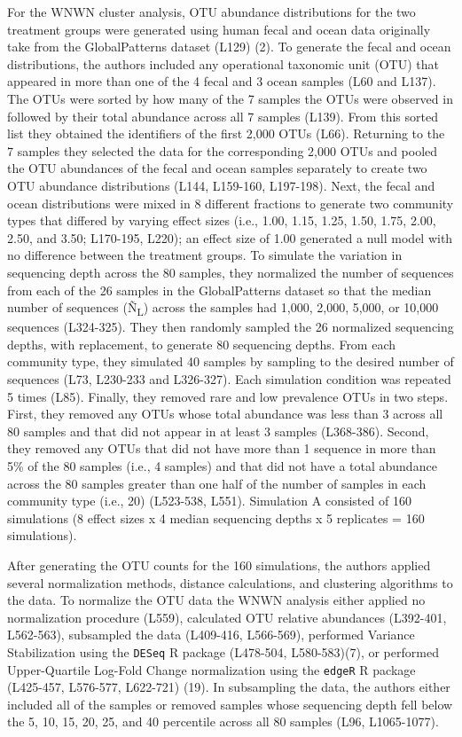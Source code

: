 \documentclass[
]{article}
\begin{document}
For the WNWN cluster analysis, OTU abundance distributions for the two
treatment groups were generated using human fecal and ocean data
originally take from the GlobalPatterns dataset (L129) (2). To generate
the fecal and ocean distributions, the authors included any operational
taxonomic unit (OTU) that appeared in more than one of the 4 fecal and 3
ocean samples (L60 and L137). The OTUs were sorted by how many of the 7
samples the OTUs were observed in followed by their total abundance
across all 7 samples (L139). From this sorted list they obtained the
identifiers of the first 2,000 OTUs (L66). Returning to the 7 samples
they selected the data for the corresponding 2,000 OTUs and pooled the
OTU abundances of the fecal and ocean samples separately to create two
OTU abundance distributions (L144, L159-160, L197-198). Next, the fecal
and ocean distributions were mixed in 8 different fractions to generate
two community types that differed by varying effect sizes (i.e., 1.00,
1.15, 1.25, 1.50, 1.75, 2.00, 2.50, and 3.50; L170-195, L220); an effect
size of 1.00 generated a null model with no difference between the
treatment groups. To simulate the variation in sequencing depth across
the 80 samples, they normalized the number of sequences from each of the
26 samples in the GlobalPatterns dataset so that the median number of
sequences (Ñ\textsubscript{L}) across the samples had 1,000, 2,000,
5,000, or 10,000 sequences (L324-325). They then randomly sampled the 26
normalized sequencing depths, with replacement, to generate 80
sequencing depths. From each community type, they simulated 40 samples
by sampling to the desired number of sequences (L73, L230-233 and
L326-327). Each simulation condition was repeated 5 times (L85).
Finally, they removed rare and low prevalence OTUs in two steps. First,
they removed any OTUs whose total abundance was less than 3 across all
80 samples and that did not appear in at least 3 samples (L368-386).
Second, they removed any OTUs that did not have more than 1 sequence in
more than 5\% of the 80 samples (i.e., 4 samples) and that did not have
a total abundance across the 80 samples greater than one half of the
number of samples in each community type (i.e., 20) (L523-538, L551).
Simulation A consisted of 160 simulations (8 effect sizes x 4 median
sequencing depths x 5 replicates = 160 simulations).

After generating the OTU counts for the 160 simulations, the authors
applied several normalization methods, distance calculations, and
clustering algorithms to the data. To normalize the OTU data the WNWN
analysis either applied no normalization procedure (L559), calculated
OTU relative abundances (L392-401, L562-563), subsampled the data
(L409-416, L566-569), performed Variance Stabilization using the
\texttt{DESeq} R package (L478-504, L580-583)(7), or performed
Upper-Quartile Log-Fold Change normalization using the \texttt{edgeR} R
package (L425-457, L576-577, L622-721) (19). In subsampling the data,
the authors either included all of the samples or removed samples whose
sequencing depth fell below the 5, 10, 15, 20, 25, and 40 percentile
across all 80 samples (L96, L1065-1077).
\end{document}
